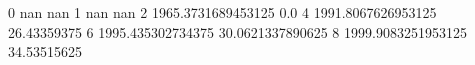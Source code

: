 0 nan nan
1 nan nan
2 1965.3731689453125 0.0
4 1991.8067626953125 26.43359375
6 1995.435302734375 30.0621337890625
8 1999.9083251953125 34.53515625
